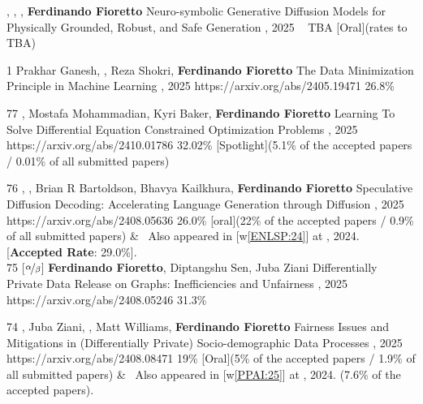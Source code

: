 \begin{pubs}
\confentryAwd
	{} 
	{, , , {\bf Ferdinando Fioretto}}
	{Neuro-symbolic Generative Diffusion Models for Physically Grounded, Robust, and Safe Generation}
	{, 2025}
	{~}
	{TBA} %
	{[Oral]}{(rates to TBA)}
	
\confentry
	{1}
	{Prakhar Ganesh, , Reza Shokri, {\bf Ferdinando Fioretto}}
	{The Data Minimization Principle in Machine Learning}
	{\procFAccT, 2025}
	{https://arxiv.org/abs/2405.19471}
	{26.8\%} %

\confentryAwd
	{77}
	{, Mostafa Mohammadian, Kyri Baker, {\bf Ferdinando Fioretto}}
	{Learning To Solve Differential Equation Constrained Optimization Problems}
	{\procICLR, 2025}
	{https://arxiv.org/abs/2410.01786}
	{32.02\%} %
	{[Spotlight]}{(5.1\% of the accepted papers / 0.01\% of all submitted papers)}

\confentryAwd
	{76}
	{, , Brian R Bartoldson, Bhavya Kailkhura, {\bf Ferdinando Fioretto}}
	{Speculative Diffusion Decoding: Accelerating Language Generation through Diffusion}
	{\procNAACL, 2025}
	{https://arxiv.org/abs/2408.05636}
	{26.0\%}
	{[oral]}{(22\% of the accepted papers / 0.9\% of all submitted papers)}
&	\hspace{4pt} \faAngleRight\, Also appeared in [w\ref{ENLSP:24}] at , 2024.
	\hspace{4pt} {[{\bf Accepted Rate}: 29.0\%].}\\[0.5em]

\confentry
	{75}
	{[$\nicefrac{\alpha}{\beta}$] {\bf Ferdinando Fioretto}, Diptangshu Sen, Juba Ziani}
	{Differentially Private Data Release on Graphs: Inefficiencies and Unfairness}
	{\procAISTATS, 2025}
	{https://arxiv.org/abs/2408.05246}
	{31.3\%} %

\confentryAwd
	{74}
	{, Juba Ziani, , Matt Williams, {\bf Ferdinando Fioretto}}
	{Fairness Issues and Mitigations in (Differentially Private) Socio-demographic Data Processes}
	{\procAAAI, 2025}
	{https://arxiv.org/abs/2408.08471}
	{19\%} %
	{[Oral]}{(5\% of the accepted papers / 1.9\% of all submitted papers)}
&	\hspace{4pt} \faAngleRight\, Also appeared in [w\ref{PPAI:25}] at , 2024. 
	\hspace{4pt} \textcolor{purple}{\faTrophy {\bf [Oral]}} (7.6\% of the accepted papers).\\[0.5em]


\end{pubs}
